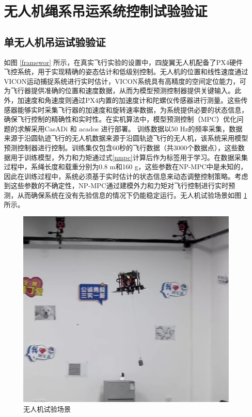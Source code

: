 \documentclass[lang=chs, degree=master, blindreview=true, winfonts=true]{yanputhesis}
\begin{document}
\section{无人机绳系吊运系统控制试验验证}
\subsection{单无人机吊运试验验证}
如图 \ref{framewor} 所示，在真实飞行实验的设置中，四旋翼无人机配备了PX4硬件飞控系统，用于实现精确的姿态估计和低级别控制。无人机的位置和线性速度通过VICON运动捕捉系统进行实时估计，VICON系统具有高精度的空间定位能力，可为飞行器提供准确的位置和速度数据，从而为模型预测控制器提供关键输入。此外，加速度和角速度则通过PX4内置的加速度计和陀螺仪传感器进行测量。这些传感器能够实时采集飞行器的加速度和旋转速率数据，为系统提供必要的状态信息，确保飞行控制的精确性和实时性。在实机算法中，模型预测控制（MPC）优化问题的求解采用CasADi \cite{Andersson2019} 和 acados \cite{Verschueren2022} 进行部署。
训练数据以50 Hz的频率采集，数据来源于沿圆轨迹飞行的无人机数据来源于沿圆轨迹飞行的无人机，该系统采用模型预测控制器进行控制。训练集仅包含60秒的飞行数据（共3000个数据点），这些数据用于训练模型，外力和力矩通过式\ref{nmpc}计算后作为标签用于学习。在数据采集过程中，系绳长度和载重分别为0.8 m和160 g，这些参数在NP-MPC中是未知的，因此在训练过程中，系统必须基于实时估计的状态信息来动态调整控制策略。考虑到这些参数的不确定性，NP-MPC通过建模外力和力矩对飞行控制进行实时预测，从而确保系统在没有先验信息的情况下仍能稳定运行。无人机试验场景如图 \ref{dan} 所示。
\begin{figure}[hbt!]
	\centering
	\includegraphics[width=28pc]{picture/danjireal.png} 
	\caption{无人机试验场景} 
	\label{dan}
\end{figure}
\end{document}
